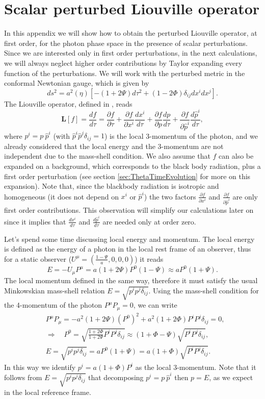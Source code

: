 \section{Scalar perturbed Liouville operator}\label{app:scalarPerturbedLiouvilleOperator}
In this appendix we will show how to obtain the perturbed Liouville operator, at first order, for the photon phase space in the presence of scalar perturbations. Since we are interested only in first order perturbations, in the next calculations, we will always neglect higher order contributions by Taylor expanding every function of the perturbations. We will work with the perturbed metric in the conformal Newtonian gauge, which is given by
$$ds^2=a^2(\eta)\left[-(1+2\Psi)d\tau^2+(1-2\Phi)\delta_{ij}dx^idx^j\right].$$
The Liouville operator, defined in , reads
$$\hat{\mathbf{L}}[f]=\frac{df}{d\tau}=\frac{\partial f}{\partial \tau}+\frac{\partial f}{\partial x^i}\frac{d x^i}{d\tau}+\frac{\partial f}{\partial p}\frac{d p}{d\tau}+\frac{\partial f}{\partial \hat p^i}\frac{d \hat p^i}{d\tau},$$
where $p^i=p\ \hat p^i$ (with $\hat p^i\hat p^j\delta_{ij}=1$) is the local 3-momentum of the photon, and we already considered that the local energy and the 3-momentum are not independent due to the mass-shell condition. We also assume that $f$ can also be expanded on a background, which corresponds to the black body radiation, plus a first order perturbation (see section \ref{sec:ThetaTimeEvolution} for more on this expansion). Note that, since the blackbody radiation is isotropic and homogeneous (it does not depend on $x^i$ or $\hat p^i$) the two factors $\frac{\partial f}{\partial x^i}$ and $\frac{\partial f}{\partial \hat p^i}$ are only first order contributions. This observation will simplify our calculations later on since it implies that $\frac{dx^i}{d\tau}$ and $\frac{d\hat p^i}{d\tau}$ are needed only at order zero.

Let's spend some time discussing local energy and momentum. The local energy is defined as the energy of a photon in the local rest frame of an observer, thus for a static observer ($U^\mu=(\frac{1-\Psi}{a},0,0,0)$) it reads
$$E=-U_\mu P^\mu=a(1+2\Psi)P^0(1-\Psi)\approx aP^0(1+\Psi).$$
The local momentum defined in the same way, therefore it must satisfy the usual Minkowskian mass-shell relation $E=\sqrt{p^ip^j\delta_{ij}}$. Using the mass-shell condition for the 4-momentum of the photon $P^\mu P_\mu=0$, we can write
\begin{align*}
    &P^\mu P_\mu=-a^2(1+2\Psi)(P^0)^2+a^2(1+2\Phi)P^iP^j\delta_{ij}=0,\\
    &\Rightarrow\quad P^0=\sqrt{\frac{1+2\Phi}{1+2\Psi}P^iP^j\delta_{ij}}\approx(1+\Phi-\Psi)\sqrt{P^iP^j\delta_{ij}},\\
    &E=\sqrt{p^ip^j\delta_{ij}}=aP^0(1+\Psi)=a(1+\Phi)\sqrt{P^iP^j\delta_{ij}}.
\end{align*}
In this way we identify $p^i=a(1+\Phi)P^i$ as the local 3-momentum. Note that it follows from $E=\sqrt{p^ip^j\delta_{ij}}$ that decomposing $p^i=p\ \hat p^i$ then $p=E$, as we expect in the local reference frame.

